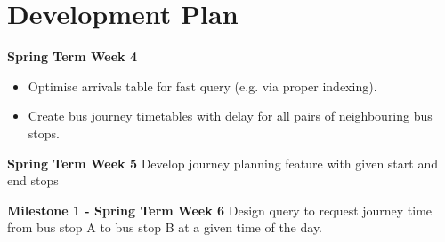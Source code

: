 \section{Development Plan}
\begin{description}
	\item \textbf{Spring Term Week 4}
    \begin{itemize}
    	\item Optimise arrivals table for fast query (e.g. via proper indexing).
		\item Create bus journey timetables with delay for all pairs of neighbouring bus stops.
    \end{itemize}
    \item \textbf{Spring Term Week 5}
    Develop journey planning feature with given start and end stops
    \item \textbf{Milestone 1 - Spring Term Week 6}
    Design query to request journey time from bus stop A to bus stop B at a given time of the day.


\end{description}
